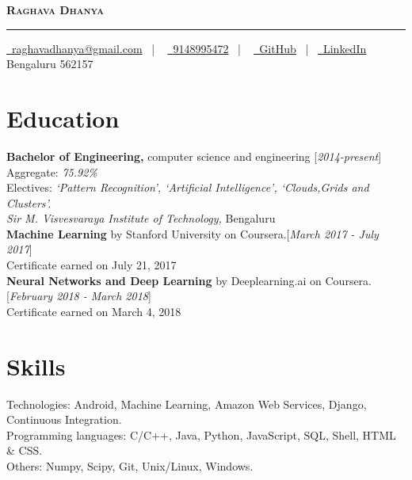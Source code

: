 \documentclass[10pt]{article}
\begin{document}
\thispagestyle{empty}

\begin{center}
    \textbf{\textsc{\Huge Raghava Dhanya}} \rule{\textwidth}{.4pt}
\end{center}

\begin{center}
    \href{mailto:raghavadhanya@gmail.com}{\faEnvelope\ raghavadhanya@gmail.com}
    \ | \ %
    \href{tel:9148995472}{\faPhoneSquare\ 9148995472} \ | \ %
    \href{https://github.com/RaghavaDhanya}{ \underline{\faGithubSquare\
    GitHub}} \ | \ \href{https://in.linkedin.com/in/raghavadhanya}{\underline
    {\faLinkedinSquare\ LinkedIn}} \\
    Bengaluru 562157
\end{center}

\section{Education} \textbf{Bachelor of Engineering,} computer science
and engineering \hfill [\textit{2014-present}]\\
Aggregate:  \textit{75.92\%}\\
Electives:  \textit{`Pattern Recognition', `Artificial Intelligence',
`Clouds,Grids and Clusters'.}\\
\textit{Sir M. Visvesvaraya Institute of Technology,} Bengaluru
\medskip
\\
\textbf{Machine Learning} by Stanford University on Coursera.\hfill [\textit
{March 2017 - July 2017}]\\
Certificate earned on July 21, 2017
\medskip\\ 
\textbf{Neural Networks and Deep Learning} by Deeplearning.ai on Coursera.\hfill [\textit
{February 2018 - March 2018}]\\
Certificate earned on March 4, 2018 

\section{Skills} Technologies:  Android, Machine Learning, Amazon Web
Services, Django, Continuous Integration.\\
Programming languages:  C/C++, Java, Python, JavaScript, SQL, Shell,
HTML \& CSS.\\
Others:  Numpy, Scipy, Git, Unix/Linux, Windows. 
\end{document}
